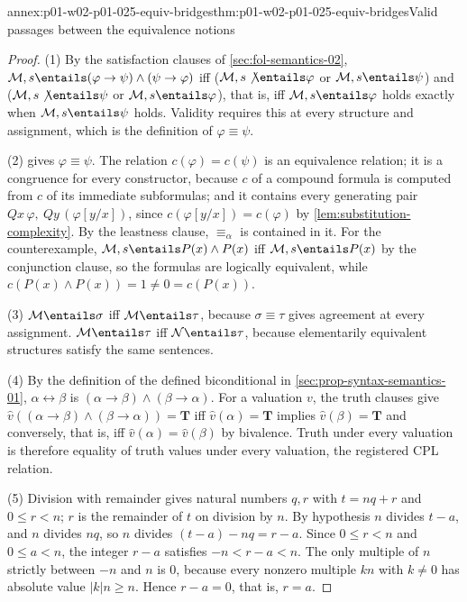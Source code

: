\begin{annexitem}{annex:p01-w02-p01-025-equiv-bridges}{thm:p01-w02-p01-025-equiv-bridges}{Valid passages between the equivalence notions}
\begin{proof}
(1) By the satisfaction clauses of \cref{sec:fol-semantics-02},
\(\mathcal M,s\entails(\varphi\to\psi)\land(\psi\to\varphi)\) iff
(\(\mathcal M,s\not\entails\varphi\) or \(\mathcal M,s\entails\psi\)) and
(\(\mathcal M,s\not\entails\psi\) or \(\mathcal M,s\entails\varphi\)), that
is, iff \(\mathcal M,s\entails\varphi\) holds exactly when
\(\mathcal M,s\entails\psi\) holds.  Validity requires this at every structure and assignment, which is
the definition of \(\varphi\equiv\psi\).

(2)  gives \(\varphi\equiv\psi\).  The relation
\(c(\varphi)=c(\psi)\) is an equivalence relation; it is a congruence for
every constructor, because \(c\) of a compound formula is computed from
\(c\) of its immediate subformulas; and it contains every generating pair
\(Qx\,\varphi,\ Qy\,(\varphi[y/x])\), since
\(c(\varphi[y/x])=c(\varphi)\) by \cref{lem:substitution-complexity}.  By
the leastness clause, \(\equiv_\alpha\) is contained in it.  For the
counterexample, \(\mathcal M,s\entails P(x)\land P(x)\) iff
\(\mathcal M,s\entails P(x)\) by the conjunction clause, so the formulas are
logically equivalent, while \(c(P(x)\land P(x))=1\ne 0=c(P(x))\).

(3) \(\mathcal M\entails\sigma\) iff \(\mathcal M\entails\tau\), because
\(\sigma\equiv\tau\) gives agreement at every assignment.
\(\mathcal M\entails\tau\) iff \(\mathcal N\entails\tau\), because
elementarily equivalent structures satisfy the same sentences.

(4) By the definition of the defined biconditional in
\cref{sec:prop-syntax-semantics-01},
\(\alpha\leftrightarrow\beta\) is \((\alpha\to\beta)\land(\beta\to\alpha)\).
For a valuation \(v\), the truth clauses give
\(\widehat v((\alpha\to\beta)\land(\beta\to\alpha))=\mathbf T\) iff
\(\widehat v(\alpha)=\mathbf T\) implies \(\widehat v(\beta)=\mathbf T\) and
conversely, that is, iff \(\widehat v(\alpha)=\widehat v(\beta)\) by
bivalence.  Truth under every valuation is therefore equality of truth
values under every valuation, the registered CPL relation.

(5) Division with remainder gives natural numbers \(q,r\) with
\(t=nq+r\) and \(0\leq r<n\); \(r\) is the remainder of \(t\) on division
by \(n\).  By hypothesis \(n\) divides \(t-a\), and \(n\) divides \(nq\),
so \(n\) divides \((t-a)-nq=r-a\).  Since \(0\leq r<n\) and
\(0\leq a<n\), the integer \(r-a\) satisfies \(-n<r-a<n\).  The only
multiple of \(n\) strictly between \(-n\) and \(n\) is \(0\), because every
nonzero multiple \(kn\) with \(k\neq0\) has absolute value \(|k|n\geq n\).
Hence \(r-a=0\), that is, \(r=a\).
\end{proof}
\end{annexitem}
